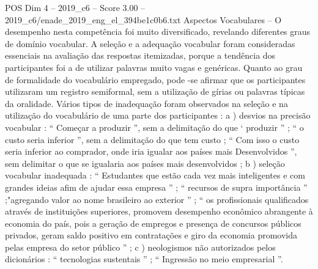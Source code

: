\begin{textsample}{POS Dim 4 – 2019\_c6 – Score 3.00 – 2019\_c6/enade\_2019\_eng\_el\_394be1c0b6.txt}
Aspectos Vocabulares – O desempenho nesta competência foi muito diversificado, revelando diferentes graus de domínio vocabular.
A seleção e a adequação vocabular foram consideradas essenciais na avaliação das respostas itemizadas, porque a tendência dos participantes foi a de utilizar palavras muito vagas e genéricas.
Quanto ao grau de formalidade do vocabulário empregado, pode -se afirmar que os participantes utilizaram um registro semiformal, sem a utilização de gírias ou palavras típicas da oralidade.
Vários tipos de inadequação foram observados na seleção e na utilização do vocabulário de uma parte dos participantes : a ) desvios na precisão vocabular : “ Começar a produzir ”, sem a delimitação do que ‘ produzir ” ; “ o custo seria inferior ”, sem a delimitação do que tem custo ; “ Com isso o custo seria inferior ao comprador, onde iria igualar aos países mais Desenvolvidos ”, sem delimitar o que se igualaria aos países mais desenvolvidos ; b ) seleção vocabular inadequada : “ Estudantes que estão cada vez mais inteligentes e com grandes ideias afim de ajudar essa empresa ” ; “ recursos de supra importância ” ;"agregando valor ao nome brasileiro ao exterior ” ; “ os profissionais qualificados através de instituições superiores, promovem desempenho econômico abrangente à economia do país, pois a geração de empregos e presença de concursos públicos privados, geram saldo positivo em contratações e giro da economia promovida pelas empresa do setor público ” ; c ) neologismos não autorizados pelos dicionários : “ tecnologias sustentais ” ; “ Ingressão no meio empresarial ”.

\end{textsample}
